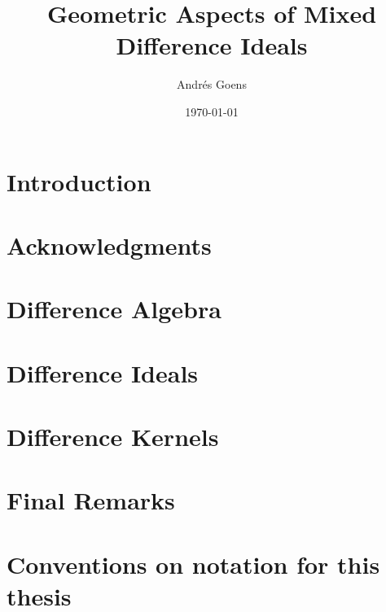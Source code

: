 \documentclass[12pt,a4paper,BCOR15mm,twoside,DIV12]{article}
\title{Geometric Aspects of Mixed Difference Ideals}
\author{Andr\'{e}s Goens}
\date{\today}
\theoremstyle{plain}
\theoremstyle{definition}
\begin{document}
\setlength{\parindent}{1.5em}

\maketitle

\clearpage
\section*{Introduction}

\clearpage
\section*{Acknowledgments}
\clearpage

\tableofcontents

\clearpage 


\section{Difference Algebra}

\clearpage 
\section{Difference Ideals}



\clearpage 



\clearpage 
\section{Difference Kernels}


\clearpage

\section{Final Remarks}


\clearpage 


\clearpage
\section*{Conventions on notation for this thesis} 


\clearpage
\printindex
\end{document}
